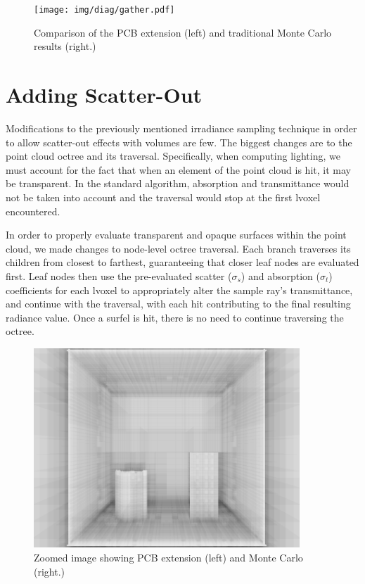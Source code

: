 \documentclass[12pt]{ucthesis}
\newcommand{\captionfonts}{\small\bf\ssp}
\begin{document}
\begin{figure}[h!]
    \centering
    \texttt{[image: img/diag/gather.pdf]}
    \captionfonts
    \caption{Comparison of the PCB extension (left) and traditional Monte Carlo results (right.)}
    \label{fig:gather}
\end{figure}

\section{Adding Scatter-Out}
\label{scatterout_sec}
Modifications to the previously mentioned irradiance sampling technique in order to allow scatter-out effects with volumes are few.  The biggest changes are to the point cloud octree and its traversal.  Specifically, when computing lighting, we must account for the fact that when an element of the point cloud is hit, it may be transparent.  In the standard algorithm, absorption and transmittance would not be taken into account and the traversal would stop at the first lvoxel encountered.

In order to properly evaluate transparent and opaque surfaces within the point cloud, we made changes to node-level octree traversal.  Each branch traverses its children from closest to farthest, guaranteeing that closer leaf nodes are evaluated first.  Leaf nodes then use the pre-evaluated scatter ($\sigma_{s}$) and absorption ($\sigma_{t}$) coefficients for each lvoxel to appropriately alter the sample ray's transmittance, and continue with the traversal, with each hit contributing to the final resulting radiance value.  Once a surfel is hit, there is no need to continue traversing the octree.

\begin{figure}[h!]
    \centering
    \includegraphics[width=100mm]{img/testing.png}
    \caption{Zoomed image showing PCB extension (left) and Monte Carlo (right.)}
    \label{fig:testing}
\end{figure}
\end{document}

